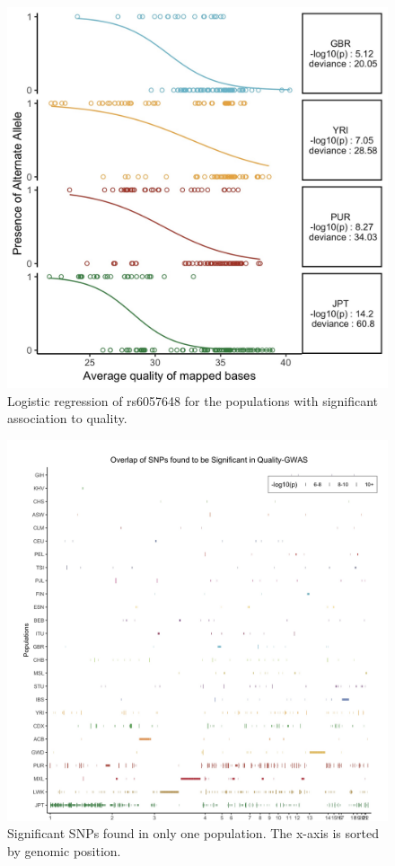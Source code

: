 \documentclass[9pt,lineno]{elife}
\begin{document}
\begin{figure}
\includegraphics[width=\hsize,keepaspectratio]{./Figures/RegressionPlot.jpg}
\caption{Logistic regression of rs6057648 for the populations with significant association to quality.}
\label{TwinsSNP}
\end{figure}

\begin{figure}
\includegraphics[width=\hsize,keepaspectratio]{./Figures/SNP6_Singles.jpg}
\caption{Significant SNPs found in only one population. The x-axis is sorted by genomic position.}
\label{Singles}
\end{figure}
\end{document}
